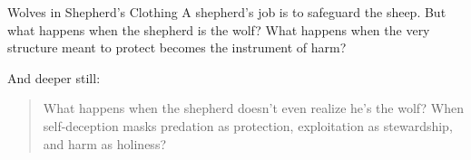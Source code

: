 \begin{HistoricalSidebar}{Wolves in Shepherd’s Clothing}
    A shepherd’s job is to safeguard the sheep.  
    But what happens when the shepherd is the wolf?  
    What happens when the very structure meant to protect becomes the instrument of harm?
    
    \medskip
    
    And deeper still:
    
    \begin{quote}
    What happens when the shepherd doesn’t even realize he’s the wolf?  
    When self-deception masks predation as protection, exploitation as stewardship, and harm as holiness?
    \end{quote}
    
\end{HistoricalSidebar}